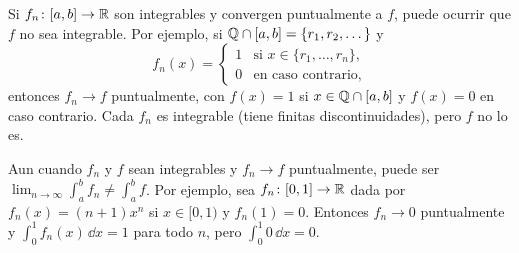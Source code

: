 \begin{note}
  Si \(f_n\colon [a, b] \to \mathbb{R}\) son integrables y convergen puntualmente a \(f\), puede ocurrir que \(f\) no sea integrable. Por ejemplo, si \(\mathbb{Q} \cap [a, b] = \{ r_1, r_2, \dots \}\) y
  \[
    f_n(x) = \begin{cases}
      1 & \text{si } x \in \{ r_1, \dots, r_n \}, \\
      0 & \text{en caso contrario,}
    \end{cases}
  \]
  entonces \(f_n \to f\) puntualmente, con \(f(x) = 1\) si \(x \in \mathbb{Q} \cap [a, b]\) y \(f(x) = 0\) en caso contrario. Cada \(f_n\) es integrable (tiene finitas discontinuidades), pero \(f\) no lo es.
\end{note}

\begin{note}
  Aun cuando \(f_n\) y \(f\) sean integrables y \(f_n \to f\) puntualmente, puede ser \(\lim_{n \to \infty} \int_a^b f_n \neq \int_a^b f\). Por ejemplo, sea \(f_n\colon [0, 1] \to \mathbb{R}\) dada por \(f_n(x) = (n + 1) x^n\) si \(x \in [0, 1)\) y \(f_n(1) = 0\). Entonces \(f_n \to 0\) puntualmente y \(\int_0^1 f_n(x) \,\dd x = 1\) para todo \(n\), pero \(\int_0^1 0 \,\dd x = 0\).
\end{note}
